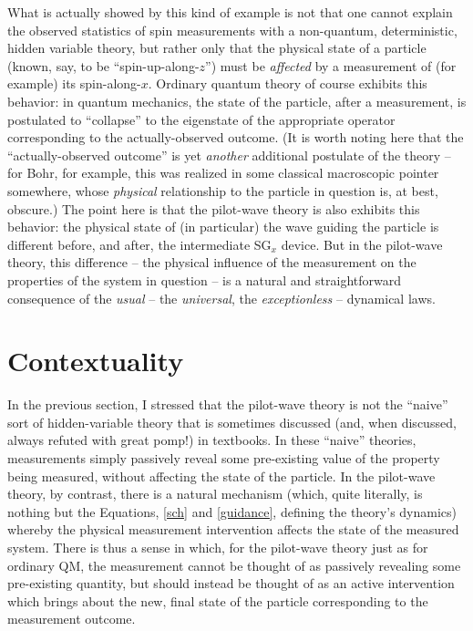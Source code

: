 \documentclass[aps,prc,onecolumn,letterpaper,floatfix,12pt]{revtex4}
\begin{document}
What is actually showed by this kind of example is not that one
cannot explain the observed statistics of spin measurements with a
non-quantum, deterministic, hidden variable theory, but rather only
that the physical state of a particle (known, say, to be
``spin-up-along-$z$'') must be \emph{affected} by a measurement of
(for example) its spin-along-$x$.  Ordinary quantum theory of
course exhibits this behavior:  in quantum
mechanics, the state of the particle, after a measurement, is
postulated to ``collapse'' to the eigenstate of the appropriate
operator corresponding to the actually-observed outcome.  (It is worth
noting here that the ``actually-observed outcome'' is yet
\emph{another} additional postulate of the theory -- for Bohr, for
example, this was realized in some classical macroscopic pointer
somewhere, whose \emph{physical} relationship to the particle in
question is, at best, obscure.)  The point here is that the pilot-wave
theory is also exhibits this behavior:  the physical state
of (in particular) the wave guiding the particle is different  before,
and after, the intermediate SG$_x$ device.  But in the pilot-wave
theory, this difference -- the physical influence of the measurement
on the properties of the system in question -- is a natural and
straightforward consequence of the \emph{usual} -- the
\emph{universal}, the \emph{exceptionless} -- dynamical laws. 




\section{Contextuality}
\label{sec5}

In the previous section, I stressed that the pilot-wave
theory is not the ``naive'' sort of hidden-variable theory that is
sometimes discussed (and, when discussed, always refuted with great
pomp!) in textbooks.  In these ``naive'' theories, measurements simply
passively reveal  some pre-existing value of the property being
measured, without affecting the state of the particle.  In the
pilot-wave theory, by contrast, there is a natural mechanism (which,
quite literally, is nothing but the Equations, \eqref{sch} and
\eqref{guidance}, defining the theory's dynamics) whereby
the physical measurement intervention affects the state of the
measured system.  There is thus a sense in which, for the pilot-wave
theory just as for ordinary QM, the measurement cannot be thought of
as passively revealing some pre-existing quantity, but should instead
be thought of as an active intervention which brings about the new, final
state of the particle corresponding to the measurement outcome.  
\end{document}
